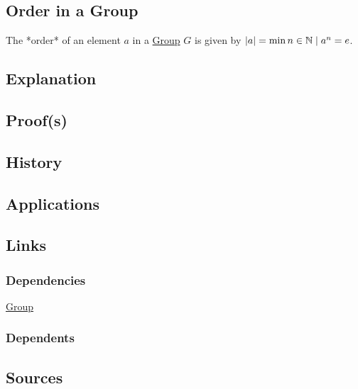\subsection{Order in a Group}\label{articles:algebra:group-theory:order-in-a-group}
The *order* of an element $a$ in a \hyperref[articles:algebra:group-theory:group]{Group} $G$ is given by $\lvert a \rvert = \min \\{n \in \mathbb{N} \mid a^n = e\\}$.

\subsection{Explanation}

\subsection{Proof(s)}

\subsection{History}

\subsection{Applications}

\subsection{Links}
\subsubsection{Dependencies}
\item \hyperref[articles:algebra:group-theory:group]{Group}
\subsubsection{Dependents}

\subsection{Sources}
